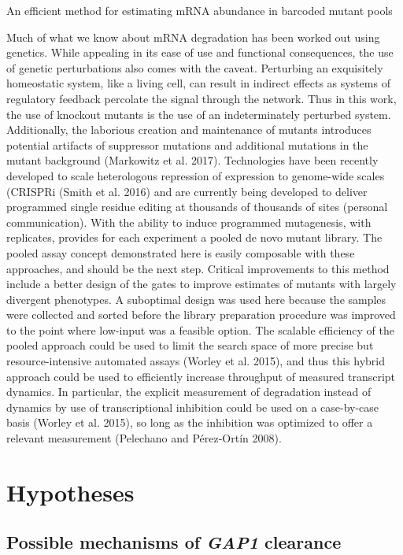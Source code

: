 An efficient method for estimating mRNA
abundance in barcoded mutant pools 


Much of what we know about mRNA
degradation has been worked out using genetics. While appealing in its
ease of use and functional consequences, the use of genetic
perturbations also comes with the caveat. Perturbing an exquisitely
homeostatic system, like a living cell, can result in indirect effects
as systems of regulatory feedback percolate the signal through the
network. Thus in this work, the use of knockout mutants is the use of
an indeterminately perturbed system. Additionally, the laborious
creation and maintenance of mutants introduces potential artifacts of
suppressor mutations and additional mutations in the mutant background
(Markowitz et al. 2017). Technologies have been recently developed to
scale heterologous repression of expression to genome-wide scales
(CRISPRi (Smith et al. 2016) and are currently being developed to
deliver programmed single residue editing at thousands of thousands of
sites (personal communication). With the ability to induce programmed
mutagenesis, with  replicates, provides for each experiment a pooled
de novo mutant library. The pooled assay concept demonstrated here is
easily composable with these approaches, and should be the next step.
Critical improvements to this method include a better design of the
gates to improve estimates of mutants with largely divergent
phenotypes. A suboptimal design was used here because the samples were
collected and sorted before the library preparation procedure was
improved to the point where low-input was a feasible option.  The
scalable efficiency of the pooled approach could be used to limit the
search space of more precise but resource-intensive automated assays
(Worley et al. 2015), and thus this hybrid approach could be used to
efficiently increase throughput of measured transcript dynamics. In
particular, the explicit measurement of degradation instead of
dynamics by use of transcriptional inhibition could be used on a
case-by-case basis (Worley et al. 2015), so long as the inhibition was
optimized to offer a relevant measurement (Pelechano and Pérez-Ortín
2008).

\section{Hypotheses}

\subsection{Possible mechanisms of \textit{GAP1} clearance}

